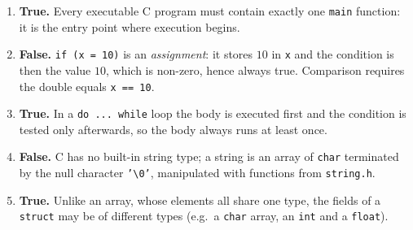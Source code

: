 \documentclass[11pt]{article}
\begin{document}
\begin{corrige}
\begin{enumerate}
\item \textbf{True.} Every executable C program must contain exactly one \texttt{main} function: it is the entry point where execution begins.
\item \textbf{False.} \texttt{if (x = 10)} is an \emph{assignment}: it stores $10$ in \texttt{x} and the condition is then the value $10$, which is non-zero, hence always true. Comparison requires the double equals \texttt{x == 10}.
\item \textbf{True.} In a \texttt{do ... while} loop the body is executed first and the condition is tested only afterwards, so the body always runs at least once.
\item \textbf{False.} C has no built-in string type; a string is an array of \texttt{char} terminated by the null character \texttt{'\textbackslash 0'}, manipulated with functions from \texttt{string.h}.
\item \textbf{True.} Unlike an array, whose elements all share one type, the fields of a \texttt{struct} may be of different types (e.g.\ a \texttt{char} array, an \texttt{int} and a \texttt{float}).
\end{enumerate}
\end{corrige}
\end{document}
